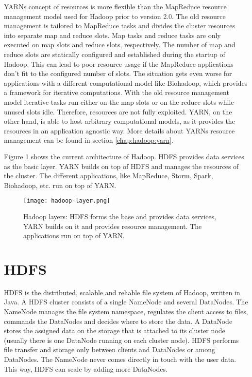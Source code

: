 YARNs concept of resources is more flexible than the MapReduce resource management model used for Hadoop prior to version 2.0. The old resource management is tailored to MapReduce tasks and divides the cluster resources into separate map and reduce slots. Map tasks and reduce tasks are only executed on map slots and reduce slots, respectively. The number of map and reduce slots are statically configured and established during the startup of Hadoop. This can lead to poor resource usage if the MapReduce applications don't fit to the configured number of slots. The situation gets even worse for applications with a different computational model like Biohadoop, which provides a framework for iterative computations. With the old resource management model iterative tasks run either on the map slots or on the reduce slots while unused slots idle. Therefore, resources are not fully exploited. YARN, on the other hand, is able to host arbitrary computational models, as it provides the resources in an application agnostic way. More details about YARNs resource management can be found in section \ref{chap:hadoop:yarn}.

Figure \ref{fig:hadoop-layer} shows the current architecture of Hadoop. HDFS provides data services as the basic layer. YARN builds on top of HDFS and manages the resources of the cluster. The different applications, like MapReduce, Storm, Spark, Biohadoop, etc. run on top of YARN.

\begin{figure}
  \centering
  \texttt{[image: hadoop-layer.png]}
  \caption[Hadoop layers]{Hadoop layers: HDFS forms the base and provides data services, YARN builds on it and provides resource management. The applications run on top of YARN.}
  \label{fig:hadoop-layer}
\end{figure}

\section{HDFS}
\label{chap:hadoop:hdfs}
HDFS is the distributed, scalable and reliable file system of Hadoop, written in Java. A HDFS cluster consists of a single NameNode and several DataNodes. The NameNode manages the file system namespace, regulates the client access to files, commands the DataNodes and decides where to store the data. A DataNode stores the assigned data on the storage that is attached to its cluster node (usually there is one DataNode running on each cluster node). HDFS performs file transfer and storage only between clients and DataNodes or among DataNodes. The NameNode never comes directly in touch with the user data. This way, HDFS can scale by adding more DataNodes.

